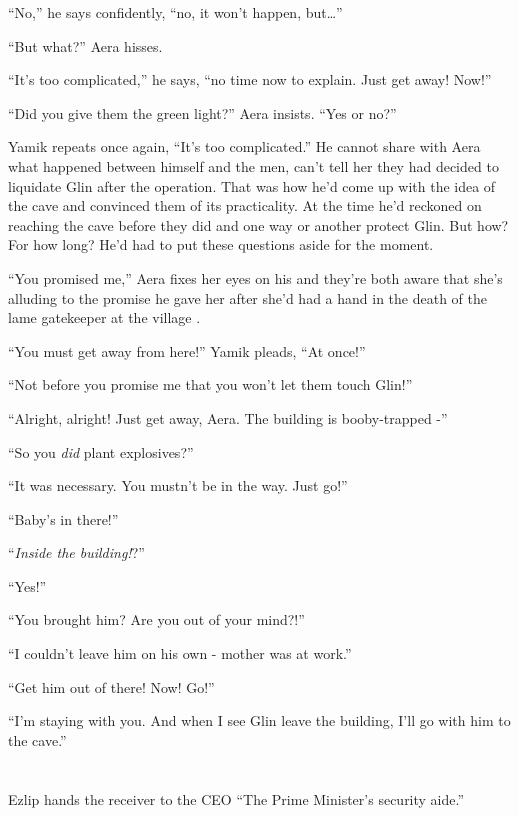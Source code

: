 \documentclass[twoside,11pt]{book}
\begin{document}
``No,'' he says{ }confidently,
``no,{ }it won't happen, but{\dots}''

``But what?'' Aera hisses.

``It's too complicated,'' he says, ``no time now to explain. Just get away!
Now!''

``Did you give them the green light?'' Aera insists. ``Yes or no?''

Yamik repeats once again, ``It's too complicated.'' He
cannot{ }share with Aera what happened between himself and the men, can't tell
her they had decided to liquidate Glin after the operation. That was how he'd come up with the idea of the cave and
convinced them of its practicality. At the time he'd reckoned on reaching the cave before they did and one way or
another protect Glin. But how? For how long? He'd had to put these questions aside for the moment.

``You promised me,'' Aera fixes her eyes on his and they're both aware that she's alluding to
the promise he gave her after she'd had a hand in the death of the lame gatekeeper at the village .

``You must get away from here!'' Yamik pleads, ``At
once!''

``Not before you promise me that you won't let them touch Glin!''

``Alright, alright! Just get away, Aera{. T}he building is
booby-trapped -''

``So you \textit{did}{ }plant explosives?''

``{I}t was{ }necessary. You
mustn't be in the way. Just go!''

``Baby's in there!''

``\textit{Inside the  building!}?''

``Yes!''

``You brought him? Are you out of your mind?!''

``I couldn't leave him on his own {{}-} mother was at
work.''

``Get him out of there! Now! Go!''

``I'm staying with you. And when I see Glin leave the building, I'll go with him to the
cave.''



\chapter{}

Ezlip hands the receiver to the CEO ``The Prime Minister's security aide.''
\end{document}
